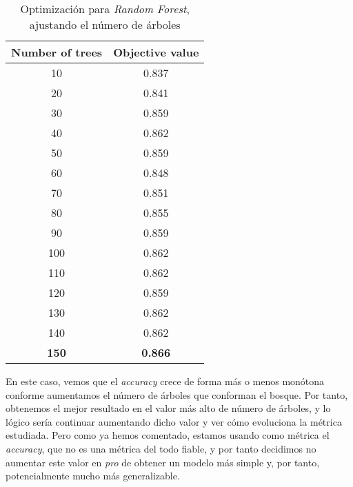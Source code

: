 \documentclass[11pt]{article}
\begin{document}
\begin{table}[H]
\begin{center}
    \begin{tabular}{|c|c|}
        \hline
        Number of trees&Objective value \\
        \hline
        10&0.837               \\
        20&0.841               \\
        30&0.859               \\
        40&0.862               \\
        50&0.859               \\
        60&0.848               \\
        70&0.851               \\
        80&0.855                \\
        90&0.859               \\
        100&0.862              \\
        110&0.862              \\
        120&0.859              \\
        130&0.862              \\
        140&0.862              \\
        \textbf{150}&\textbf{0.866}              \\
        \hline
    \end{tabular}
\end{center}
    \caption{Optimización para \emph{Random Forest}, ajustando el número de árboles}
\end{table}

En este caso, vemos que el \emph{accuracy} crece de forma más o menos monótona conforme aumentamos el número de árboles que conforman el bosque. Por tanto, obtenemos el mejor resultado en el valor más alto de número de árboles, y lo lógico sería continuar aumentando dicho valor y ver cómo evoluciona la métrica estudiada. Pero como ya hemos comentado, estamos usando como métrica el \emph{accuracy}, que no es una métrica del todo fiable, y por tanto decidimos no aumentar este valor en \emph{pro} de obtener un modelo más simple y, por tanto, potencialmente mucho más generalizable.
\end{document}
